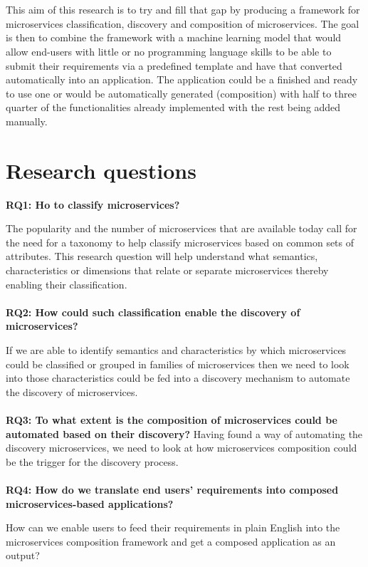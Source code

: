 \documentclass{article}
\begin{document}
\\
\\
\noindent This aim of this research is to try and fill that gap by producing a framework for microservices classification, discovery and composition of microservices. The goal is then to combine the framework with a machine learning model that would allow end-users with little or no programming language skills to be able to submit their requirements via a predefined template and have that converted automatically into an application. The application could be a finished and ready to use one or would be automatically generated (composition) with half to three quarter of the functionalities already implemented with the rest being added manually.


\section{Research questions}


\noindent \textbf{RQ1: Ho to classify microservices?}

\noindent The popularity and the number of microservices that are available today call for the need for a taxonomy to help classify microservices based on common sets of attributes. This research question will help understand what semantics, characteristics or dimensions that relate or separate microservices thereby enabling their classification.
\\
\\
\noindent \textbf{RQ2: How could such classification enable the discovery of microservices?}

\noindent If we are able to identify semantics and characteristics by which microservices could be classified or grouped in families of microservices then we need to look into those characteristics could be fed into a discovery mechanism to automate the discovery of microservices.
\\
\\
\noindent \textbf{RQ3: To what extent is the composition of microservices could be automated based on their discovery?}
\noindent Having found a way of automating the discovery microservices, we need to look at how microservices composition could be the trigger for the discovery process.
\\
\\
\noindent \textbf{RQ4: How do we translate end users’ requirements into composed microservices-based applications?}

\noindent How can we enable users to feed their requirements in plain English into the microservices composition framework and get a composed application as an output? 
\end{document}
